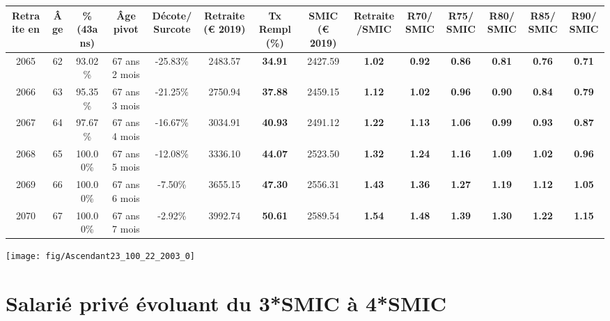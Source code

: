\begin{adjustbox}{max width=\textwidth} 
\begin{tabular}[htb]{|c|c||c|c|c||c|c||c|c||c|c|c|c|c|} 
\hline 
 Retraite en &  Âge &  \%(43ans) &  Âge pivot &  Décote/Surcote &  Retraite (\euro{} 2019) &  Tx Rempl(\%) &  SMIC (\euro{} 2019) &  Retraite/SMIC &  R70/SMIC &  R75/SMIC &  R80/SMIC &  R85/SMIC &  R90/SMIC \\ 
\hline \hline 
 2065 &  62 &  93.02\% &  67 ans 2 mois &  -25.83\% &  2483.57 &  {\bf 34.91} &  2427.59 &  {\bf 1.02} &  {\bf {\color{red} 0.92}} &  {\bf {\color{red} 0.86}} &  {\bf {\color{red} 0.81}} &  {\bf {\color{red} 0.76}} &  {\bf {\color{red} 0.71}} \\ 
\hline 
 2066 &  63 &  95.35\% &  67 ans 3 mois &  -21.25\% &  2750.94 &  {\bf 37.88} &  2459.15 &  {\bf 1.12} &  {\bf 1.02} &  {\bf {\color{red} 0.96}} &  {\bf {\color{red} 0.90}} &  {\bf {\color{red} 0.84}} &  {\bf {\color{red} 0.79}} \\ 
\hline 
 2067 &  64 &  97.67\% &  67 ans 4 mois &  -16.67\% &  3034.91 &  {\bf 40.93} &  2491.12 &  {\bf 1.22} &  {\bf 1.13} &  {\bf 1.06} &  {\bf {\color{red} 0.99}} &  {\bf {\color{red} 0.93}} &  {\bf {\color{red} 0.87}} \\ 
\hline 
 2068 &  65 &  100.00\% &  67 ans 5 mois &  -12.08\% &  3336.10 &  {\bf 44.07} &  2523.50 &  {\bf 1.32} &  {\bf 1.24} &  {\bf 1.16} &  {\bf 1.09} &  {\bf 1.02} &  {\bf {\color{red} 0.96}} \\ 
\hline 
 2069 &  66 &  100.00\% &  67 ans 6 mois &  -7.50\% &  3655.15 &  {\bf 47.30} &  2556.31 &  {\bf 1.43} &  {\bf 1.36} &  {\bf 1.27} &  {\bf 1.19} &  {\bf 1.12} &  {\bf 1.05} \\ 
\hline 
 2070 &  67 &  100.00\% &  67 ans 7 mois &  -2.92\% &  3992.74 &  {\bf 50.61} &  2589.54 &  {\bf 1.54} &  {\bf 1.48} &  {\bf 1.39} &  {\bf 1.30} &  {\bf 1.22} &  {\bf 1.15} \\ 
\hline 
\hline 
\end{tabular} 
\end{adjustbox} 
 
 \vspace{0.1cm} 

 {\hspace{-2.2cm}\texttt{[image: fig/Ascendant23\_100\_22\_2003\_0]}} 

\newpage 
 
\chapter{Salarié privé évoluant du 3*SMIC à 4*SMIC} 

